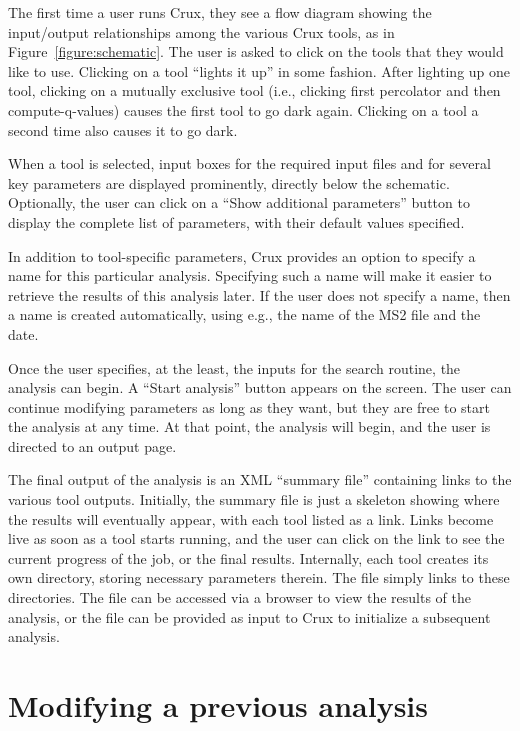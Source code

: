 \documentclass{article}
\begin{document}
The first time a user runs Crux, they see a flow diagram showing the
input/output relationships among the various Crux tools, as in
Figure~\ref{figure:schematic}.  The user is asked to click on the
tools that they would like to use.  Clicking on a tool ``lights it
up'' in some fashion.  After lighting up one tool, clicking on a
mutually exclusive tool (i.e., clicking first percolator and then
compute-q-values) causes the first tool to go dark again.  Clicking on
a tool a second time also causes it to go dark.

When a tool is selected, input boxes for the required input files and
for several key parameters are displayed prominently, directly below
the schematic.  Optionally, the user can click on a ``Show additional
parameters'' button to display the complete list of parameters, with
their default values specified.

In addition to tool-specific parameters, Crux provides an option to
specify a name for this particular analysis.  Specifying such a name
will make it easier to retrieve the results of this analysis later.
If the user does not specify a name, then a name is created
automatically, using e.g., the name of the MS2 file and the date.

Once the user specifies, at the least, the inputs for the search
routine, the analysis can begin.  A ``Start analysis'' button appears
on the screen.  The user can continue modifying parameters as long as
they want, but they are free to start the analysis at any time.  At
that point, the analysis will begin, and the user is directed to an
output page.

The final output of the analysis is an XML ``summary file'' containing
links to the various tool outputs.  Initially, the summary file is
just a skeleton showing where the results will eventually appear, with
each tool listed as a link.  Links become live as soon as a tool
starts running, and the user can click on the link to see the current
progress of the job, or the final results.  Internally, each tool
creates its own directory, storing necessary parameters therein.  The
file simply links to these directories.  The file can be accessed via
a browser to view the results of the analysis, or the file can be
provided as input to Crux to initialize a subsequent analysis.

\section{Modifying a previous analysis}
\end{document}
